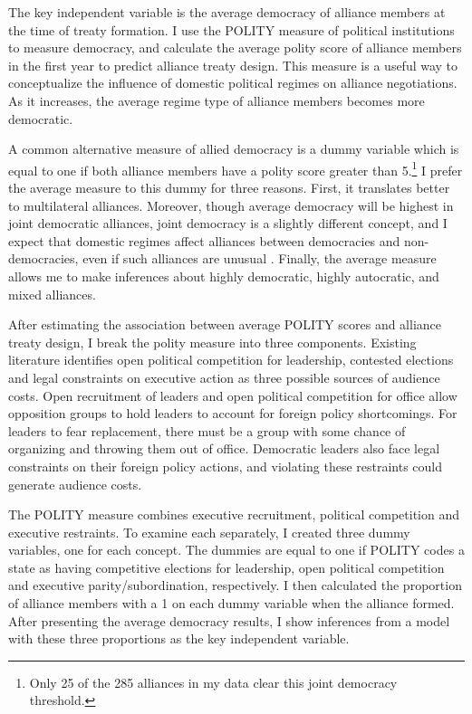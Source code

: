 \documentclass[12pt]{article}
\begin{document}
The key independent variable is the average democracy of alliance members at the time of treaty formation. 
I use the POLITY measure of political institutions to measure democracy, and calculate the average polity score of alliance members in the first year to predict alliance treaty design. 
This measure is a useful way to conceptualize the influence of domestic political regimes on alliance negotiations. 
As it increases, the average regime type of alliance members becomes more democratic. 


A common alternative measure of allied democracy is a dummy variable which is equal to one if both alliance members have a polity score greater than 5.\footnote{Only 25 of the 285 alliances in my data clear this joint democracy threshold.}
I prefer the average measure to this dummy for three reasons.
First, it translates better to multilateral alliances. 
Moreover, though average democracy will be highest in joint democratic alliances, joint democracy is a slightly different concept, and I expect that domestic regimes affect alliances between democracies and non-democracies, even if such alliances are unusual \citep{Leeds1999}.
Finally, the average measure allows me to make inferences about highly democratic, highly autocratic, and mixed alliances. 


After estimating the association between average POLITY scores and alliance treaty design, I break the polity measure into three components. 
Existing literature identifies open political competition for leadership, contested elections and legal constraints on executive action as three possible sources of audience costs. 
Open recruitment of leaders and open political competition for office allow opposition groups to hold leaders to account for foreign policy shortcomings. 
For leaders to fear replacement, there must be a group with some chance of organizing and throwing them out of office.
Democratic leaders also face legal constraints on their foreign policy actions, and violating these restraints could generate audience costs. 

 
The POLITY measure combines executive recruitment, political competition and executive restraints. 
To examine each separately, I created three dummy variables, one for each concept. 
The dummies are equal to one if POLITY codes a state as having competitive elections for leadership, open political competition and executive parity/subordination, respectively. 
I then calculated the proportion of alliance members with a 1 on each dummy variable when the alliance formed. 
After presenting the average democracy results, I show inferences from a model with these three proportions as the key independent variable.
\end{document}
